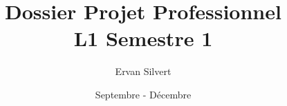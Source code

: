\documentclass[12pt, a4paper]{report} %
\author{Ervan Silvert}
\title{Dossier Projet Professionnel \\ L1 Semestre 1}
\date{Septembre - Décembre}
\begin{document}





\newcommand{\finalword}[1]{\\ \begin{center} \textsc{#1} \end{center} }
\newcommand{\qst}[1]{{\slshape \bfseries \center   #1}}
\newcommand{\asw}[2]{\paragraph{\scriptsize #1} \begin{quotation} {\slshape  \og #2 \fg}  \end{quotation}}
\newcommand{\aswTwo}[2]{\paragraph{\scriptsize #1} {\begin{multicols}{2}  \slshape  \og #2 \fg \end{multicols} }}
\newcommand{\analyse}[1]{ \paragraph{\textbf{Analyse}} {#1} }
\newcommand{\lil}[1]{{\scriptsize (#1)}}
\newcommand{\java}    {l'annonce de recrutement d'un developpeur java }
\newcommand{\gameplay}{l'annonce de recrutement d'un développeur en gameplay UI }
\newcommand{\ingc}    {l'annonce de recrutement d'un ingénieur C++ }
\newcommand{\ia}      {l'annonce de recrutement d'un programmeur IA }
\newcommand{\online}  {l'annonce de recrutement d'un programmer online }
\newcommand{\ecite}[1]{{\cite{#1}}}
\newcommand{\offsite}[1]{\footnote{Site officiel: \url{#1}}}

\newcommand{\pdf}[1]{ \texttt{[image: Offres/\#1.pdf]}  }
\newcommand{\cubical}{Fabien Perrot {\slshape aka CodingMarmot}}
\newcommand{\agg}{Antoine Guerchais, {\slshape le Généreux}}
\newcommand{\sr}{Sophie Remy}
\newcommand{\etc}{{\itshape etc.}}
\newcommand{\lni}{{\slshape La Nuit de L'informatique 2014 }}
\newcommand{\ingls}{\footnote{La définition de ce mot se trouve dans le glossaire en \ref{glos}}}
\newcommand{\acrnote}[1]{\acrshort{#1}\ingls{}}
\end{document}
